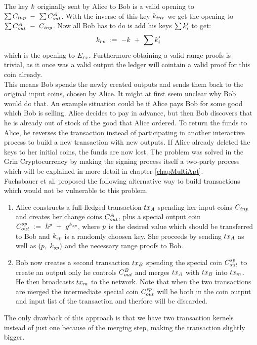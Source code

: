 The key $k$ originally sent by Alice to Bob is a valid opening to $\sum{C_{inp}} ~-~ \sum{C_{out}^A}$. With the inverse of this key $k_{inv}$ we get the opening to $\sum{C_{out}^A ~-~C_{inp}}$.
Now all Bob has to do is add his keys $\sum{k'_i}$ to get:
\[ k_{rv} ~:=~ -k ~+~ \sum{k'_i} \]
which is the opening to $E_{rv}$. Furthermore obtaining a valid range proofs is trivial, as it once was a valid output the ledger will cointain a valid proof for this coin already. \\
This means Bob spends the newly created outputs and sends them back to the original input coins, chosen by Alice. It might at first seem unclear why Bob would do that. An example situation could be if Alice
pays Bob for some good which Bob is selling. Alice decides to pay in advance, but then Bob discovers that he is already out of stock of the good that Alice ordered. To return the funds to Alice, he reverses
the transaction instead of participating in another interactive process to build a new transaction with new outputs. If Alice already deleted the keys to her initial coins, the funds are now lost.
The problem was solved in the Grin Cryptocurrency by making the signing process itself a two-party process which will be explained in more detail in chapter \ref{chapMultiApt}. \\

Fuchsbauer et al. \cite{fuchsbauer2019aggregate} proposed the following alternative way to build transactions which would not be vulnerable to this problem.
\begin{enumerate}
    \item Alice constructs a full-fledged transaction $tx_A$ spending her input coins $C_{inp}$ and creates her change coins $C_{out}^A$, plus a special output coin $C_{out}^{sp} ~:=~ h^{p} ~+~ g^{k_{sp}}$,
    where $p$ is the desired value which should be transferred to Bob and $k_{sp}$ is a randomly choosen key. She proceeds by sending $tx_A$ as well as $(p ,~ k_{sp})$ and the necessary range
    proofs to Bob.
    \item Bob now creates a second transaction $tx_B$ spending the special coin $C_{out}^{sp}$ to create an output only he controls $C_{out}^{B}$ and merges $tx_A$ with $tx_B$
    into $tx_m$. He then broadcasts $tx_m$ to the network. Note that when the two transactions are merged the intermediate special coin $C_{out}^{sp}$ will be both in the coin output and input list
    of the transaction and therfore will be discarded.
\end{enumerate}
The only drawback of this approach is that we have two transaction kernels instead of just one because of the merging step, making the transaction slightly bigger.

